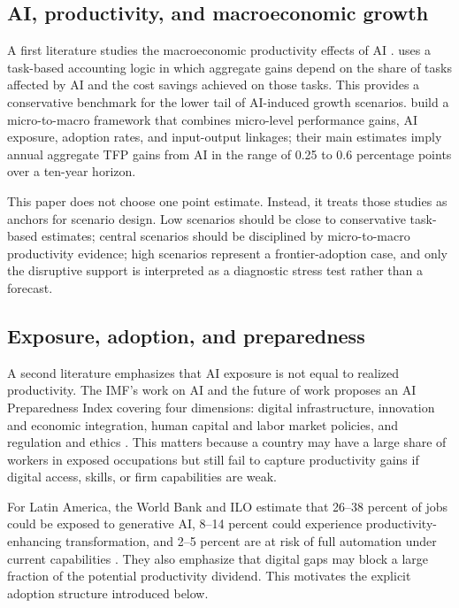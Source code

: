 \documentclass[11pt,a4paper]{article}
\begin{document}
\subsection{AI, productivity, and macroeconomic growth}

A first literature studies the macroeconomic productivity effects of AI \citep{oecd2024impactai}. \citet{acemoglu2024simple} uses a task-based accounting logic in which aggregate gains depend on the share of tasks affected by AI and the cost savings achieved on those tasks. This provides a conservative benchmark for the lower tail of AI-induced growth scenarios. \citet{filippucci2024miracle} build a micro-to-macro framework that combines micro-level performance gains, AI exposure, adoption rates, and input-output linkages; their main estimates imply annual aggregate TFP gains from AI in the range of 0.25 to 0.6 percentage points over a ten-year horizon.

This paper does not choose one point estimate. Instead, it treats those studies as anchors for scenario design. Low scenarios should be close to conservative task-based estimates; central scenarios should be disciplined by micro-to-macro productivity evidence; high scenarios represent a frontier-adoption case, and only the disruptive support is interpreted as a diagnostic stress test rather than a forecast.

\subsection{Exposure, adoption, and preparedness}

A second literature emphasizes that AI exposure is not equal to realized productivity. The IMF's work on AI and the future of work proposes an AI Preparedness Index covering four dimensions: digital infrastructure, innovation and economic integration, human capital and labor market policies, and regulation and ethics \citep{cazzaniga2024genai}. This matters because a country may have a large share of workers in exposed occupations but still fail to capture productivity gains if digital access, skills, or firm capabilities are weak.

For Latin America, the World Bank and ILO estimate that 26--38 percent of jobs could be exposed to generative AI, 8--14 percent could experience productivity-enhancing transformation, and 2--5 percent are at risk of full automation under current capabilities \citep{worldbankilo2024lacgenai}. They also emphasize that digital gaps may block a large fraction of the potential productivity dividend. This motivates the explicit adoption structure introduced below.
\end{document}
